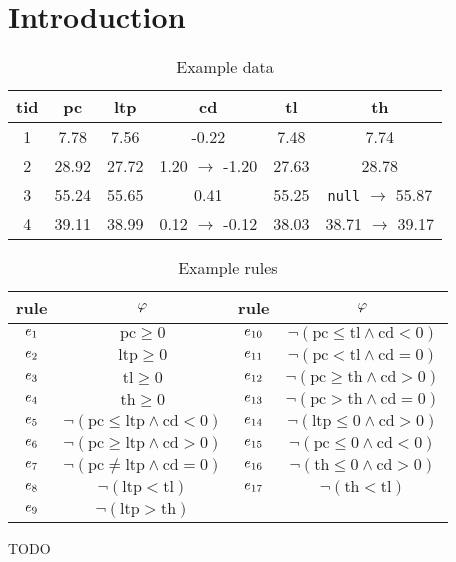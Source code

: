 \section{Introduction}
\label{sec:introduction}

\begin{table}[hb]%
    \caption{Example data}
    \label{tab:runningexampledata}
    \begin{tabular}{c||c|c|c|c|c}
        \toprule
        \textbf{tid} & \textbf{pc} & \textbf{ltp} & \textbf{cd} & \textbf{tl} & \textbf{th} \\
        \midrule
        1 & 7.78 & 7.56 & -0.22 & 7.48 & 7.74 \\
        2 & 28.92 & 27.72 & 1.20 $\rightarrow$ -1.20 & 27.63 & 28.78 \\
        3 & 55.24 & 55.65 & 0.41 & 55.25 & \texttt{null} $\rightarrow$ 55.87 \\
        4 & 39.11 & 38.99 & 0.12 $\rightarrow$ -0.12 & 38.03 & 38.71 $\rightarrow$ 39.17 \\
        \bottomrule
    \end{tabular}
\end{table}

\begin{table}[hb]%
    \caption{Example rules}
    \label{tab:runningexamplerules}
    \begin{tabular}{c|c||c|c}
        \toprule
        \textbf{rule} & $\varphi$ & \textbf{rule} & $\varphi$ \\
        \midrule
        $e_{1}$ & $\text{pc} \geq 0$ & $e_{10}$ & $\neg (\text{pc} \leq \text{tl} \wedge \text{cd} < 0)$ \\
        $e_{2}$ & $\text{ltp} \geq 0$ & $e_{11}$ & $\neg (\text{pc} < \text{tl} \wedge \text{cd} = 0)$ \\
        $e_{3}$ & $\text{tl} \geq 0$ & $e_{12}$ & $\neg (\text{pc} \geq \text{th} \wedge \text{cd} > 0)$ \\
        $e_{4}$ & $\text{th} \geq 0$ & $e_{13}$ & $\neg (\text{pc} > \text{th} \wedge \text{cd} = 0)$ \\
        $e_{5}$ & $\neg (\text{pc} \leq \text{ltp} \wedge \text{cd} < 0)$ & $e_{14}$ & $\neg (\text{ltp} \leq 0 \wedge \text{cd} > 0)$ \\
        $e_{6}$ & $\neg (\text{pc} \geq \text{ltp} \wedge \text{cd} > 0)$ & $e_{15}$ & $\neg (\text{pc} \leq 0 \wedge \text{cd} < 0)$ \\
        $e_{7}$ & $\neg (\text{pc} \neq \text{ltp} \wedge \text{cd} = 0)$ & $e_{16}$ & $\neg (\text{th} \leq 0 \wedge \text{cd} > 0)$ \\
        $e_{8}$ & $\neg (\text{ltp} < \text{tl})$ & $e_{17}$ & $\neg (\text{th} < \text{tl})$ \\
        $e_{9}$ & $\neg (\text{ltp} > \text{th})$ & & \\
        \bottomrule
    \end{tabular}
\end{table}

\begin{example}
\label{ex:runningexample}
    TODO
\end{example}